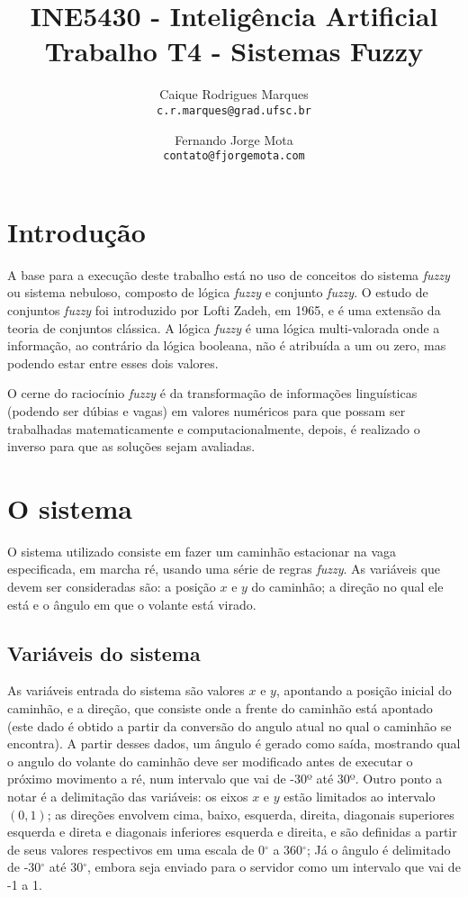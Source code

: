 \documentclass{article}
\title{\textbf{INE5430 - Inteligência Artificial \\
        \large Trabalho T4 - Sistemas Fuzzy}}
\author{
    Caique Rodrigues Marques \\
    {\texttt{c.r.marques@grad.ufsc.br}}
    \and
    Fernando Jorge Mota \\
    {\texttt{contato@fjorgemota.com}}
    \vspace{-5mm}
}
\date{}
\begin{document}
    \maketitle
    
    \section*{Introdução}
        A base para a execução deste trabalho está no uso de conceitos do
        sistema \textit{fuzzy} ou sistema nebuloso, composto de lógica
        \textit{fuzzy} e conjunto \textit{fuzzy}. O estudo de conjuntos
        \textit{fuzzy} foi introduzido por Lofti Zadeh, em 1965, e é uma
        extensão da teoria de conjuntos clássica. A lógica \textit{fuzzy} é uma
        lógica multi-valorada onde a informação, ao contrário da lógica
        booleana, não é atribuída a um ou zero, mas podendo estar entre esses
        dois valores.
        
        O cerne do raciocínio \textit{fuzzy} é da transformação de informações
        linguísticas (podendo ser dúbias e vagas) em valores numéricos para que
        possam ser  trabalhadas matematicamente e computacionalmente, depois, é
        realizado o inverso para que as soluções sejam avaliadas.
    
    \section*{O sistema}
        O sistema utilizado consiste em fazer um caminhão estacionar na vaga
        especificada, em marcha ré, usando uma série de regras \textit{fuzzy}.
        As variáveis que devem ser consideradas são: a posição $x$ e $y$ do
        caminhão; a direção no qual ele está e o ângulo em que o volante está
        virado.
        
    \subsection*{Variáveis do sistema}
        As variáveis entrada do sistema são valores $x$ e $y$, apontando a
        posição inicial do caminhão, e a direção, que consiste onde a frente do
        caminhão está apontado (este dado é obtido a partir da conversão do
        angulo atual no qual o caminhão se encontra). A partir desses dados, um
        ângulo é gerado como saída, mostrando qual o angulo do volante do
        caminhão deve ser modificado antes de executar o próximo movimento a
        ré, num intervalo que vai de -30º até 30º. Outro ponto a notar é a
        delimitação das variáveis: os eixos $x$ e $y$ estão limitados ao
        intervalo $(0, 1)$; as direções envolvem cima, baixo, esquerda,
        direita, diagonais superiores esquerda e direta e diagonais inferiores
        esquerda e direita, e são definidas a partir de seus valores
        respectivos em uma escala de 0$^\circ$ a 360$^\circ$; Já o ângulo é
        delimitado de -30$^\circ$ até 30$^\circ$, embora seja enviado para o
        servidor como um intervalo que vai de -1 a 1.
        
\end{document}
